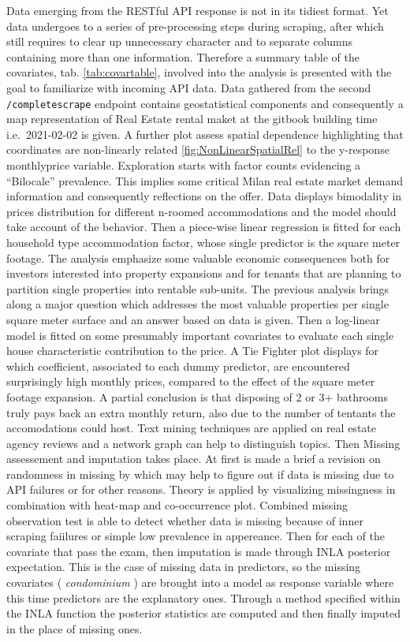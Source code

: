 \documentclass[
  12pt,
  a4paper,
  oneside]{book}
\newcommand{\passthrough}[1]{#1}
\theoremstyle{definition}
\theoremstyle{definition}
\theoremstyle{definition}
\theoremstyle{remark}
\begin{document}
Data emerging from the RESTful API response is not in its tidiest format. Yet data undergoes to a series of pre-processing steps during scraping, after which still requires to clear up unnecessary character and to separate columns containing more than one information. Therefore a summary table of the covariates, tab. \ref{tab:covartable}, involved into the analysis is presented with the goal to familiarize with incoming API data. Data gathered from the second \passthrough{\lstinline!/completescrape!} endpoint contains geostatistical components and consequently a map representation of Real Estate rental maket at the gitbook building time i.e.~2021-02-02 is given. A further plot assess spatial dependence highlighting that coordinates are non-linearly related \ref{fig:NonLinearSpatialRel} to the y-response monthlyprice variable. Exploration starts with factor counts evidencing a ``Bilocale'' prevalence. This implies some critical Milan real estate market demand information and consequently reflections on the offer. Data displays bimodality in prices distribution for different n-roomed accommodations and the model should take account of the behavior. Then a piece-wise linear regression is fitted for each household type accommodation factor, whose single predictor is the square meter footage. The analysis emphasize some valuable economic consequences both for investors interested into property expansions and for tenants that are planning to partition single properties into rentable sub-units. The previous analysis brings along a major question which addresses the most valuable properties per single square meter surface and an answer based on data is given. Then a log-linear model is fitted on some presumably important covariates to evaluate each single house characteristic contribution to the price. A Tie Fighter plot displays for which coefficient, associated to each dummy predictor, are encountered surprisingly high monthly prices, compared to the effect of the square meter footage expansion. A partial conclusion is that disposing of 2 or 3+ bathrooms truly pays back an extra monthly return, also due to the number of tentants the accomodations could host. Text mining techniques are applied on real estate agency reviews and a network graph can help to distinguish topics. Then Missing assessement and imputation takes place. At first is made a brief a revision on randomness in missing by \citet{Little} which may help to figure out if data is missing due to API failures or for other reasons. Theory is applied by visualizing missingness in combination with heat-map and co-occurrence plot. Combined missing observation test is able to detect whether data is missing because of inner scraping faiilures or simple low prevalence in appereance. Then for each of the covariate that pass the exam, then imputation is made through INLA posterior expectation. This is the case of missing data in predictors, so the missing covariates ( \emph{condominium} ) are brought into a model as response variable where this time predictors are the explanatory ones. Through a method specified within the INLA function the posterior statistics are computed and then finally imputed in the place of missing ones.
\end{document}
